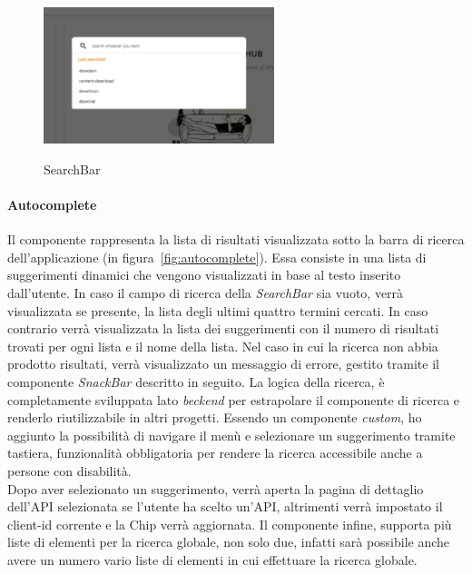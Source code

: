 \begin{figure}[ht]
  \centering
  \includegraphics[width=0.6\textwidth, alt={Barra di ricerca globale dell'applicazione}]{images/frontend/SearchBar.jpg}
  \caption{SearchBar}\label{fig:search-bar}
\end{figure}

\paragraph{Autocomplete}\label{par:autocomplete}
Il componente rappresenta la lista di risultati visualizzata sotto la barra di ricerca dell'applicazione (in figura~\ref{fig:autocomplete}).
Essa consiste in una lista di suggerimenti dinamici che vengono visualizzati in base al testo inserito dall'utente. 
In caso il campo di ricerca della \textit{SearchBar} sia vuoto, verrà visualizzata se presente, la lista degli ultimi quattro termini cercati.
In caso contrario verrà visualizzata la lista dei suggerimenti con il numero di risultati trovati per ogni lista e il nome della lista.
Nel caso in cui la ricerca non abbia prodotto risultati, verrà visualizzato un messaggio di errore, gestito tramite il componente \textit{SnackBar} descritto in seguito.
La logica della ricerca, è completamente sviluppata lato \textit{beckend} per estrapolare il componente di ricerca e renderlo riutilizzabile in altri progetti.
Essendo un componente \textit{custom}, ho aggiunto la possibilità di navigare il menù e selezionare un suggerimento tramite tastiera, funzionalità 
obbligatoria per rendere la ricerca accessibile anche a persone con disabilità.\\
Dopo aver selezionato un suggerimento, verrà aperta la pagina di dettaglio dell'API selezionata se l'utente ha scelto un'API, altrimenti verrà impostato il client-id corrente e la Chip verrà aggiornata.
Il componente infine, supporta più liste di elementi per la ricerca globale, non solo due, infatti sarà possibile anche avere un numero vario liste di elementi in cui effettuare
la ricerca globale. 

